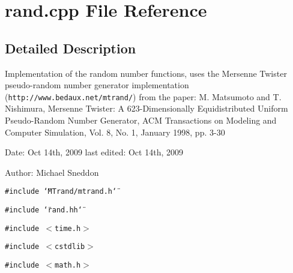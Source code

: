 \section{rand.cpp File Reference}
\label{rand_8cpp}


\subsection{Detailed Description}
Implementation of the random number functions, uses the Mersenne Twister pseudo-random number generator implementation ({\tt http://www.bedaux.net/mtrand/}) from the paper: M. Matsumoto and T. Nishimura, Mersenne Twister: A 623-Dimensionally Equidistributed Uniform Pseudo-Random Number Generator, ACM Transactions on Modeling and Computer Simulation, Vol. 8, No. 1, January 1998, pp. 3-30

\begin{Desc}
\item[Date:]Oct 14th, 2009 last edited: Oct 14th, 2009\end{Desc}
\begin{Desc}
\item[Author:]Michael Sneddon \end{Desc}


{\tt \#include \char`\"{}MTrand/mtrand.h\char`\"{}}\par
{\tt \#include \char`\"{}rand.hh\char`\"{}}\par
{\tt \#include $<$time.h$>$}\par
{\tt \#include $<$cstdlib$>$}\par
{\tt \#include $<$math.h$>$}\par
